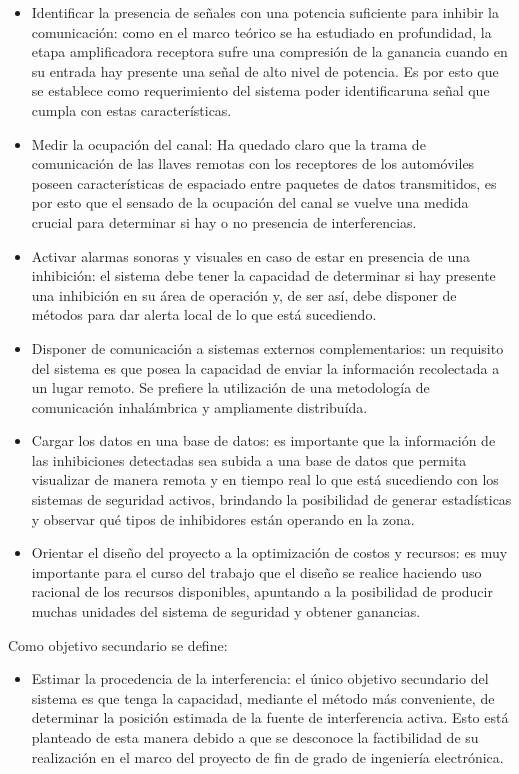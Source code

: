 \documentclass[12pt]{report}
\begin{document}
\begin{itemize}
    \item Identificar la presencia de señales con una potencia suficiente para inhibir la comunicación: como en el marco teórico se ha 
    estudiado en profundidad, la etapa amplificadora receptora sufre una compresión de la ganancia cuando en su entrada hay presente 
    una señal de alto nivel de potencia. Es por esto que se establece como requerimiento del sistema poder identificaruna señal que cumpla con
    estas características.
    \item Medir la ocupación del canal: Ha quedado claro que la trama de comunicación de las llaves remotas con los receptores de los automóviles 
    poseen características de espaciado entre paquetes de datos transmitidos, es por esto que el sensado de la ocupación del canal se vuelve 
    una medida crucial para determinar si hay o no presencia de interferencias.
    \item Activar alarmas sonoras y visuales en caso de estar en presencia de una inhibición: el sistema debe tener la capacidad de determinar 
    si hay presente una inhibición en su área de operación y, de ser así, debe disponer de métodos para dar alerta local de lo que está sucediendo.
    \item Disponer de comunicación a sistemas externos complementarios: un requisito del sistema es que posea la capacidad de enviar la información recolectada
    a un lugar remoto. Se prefiere la utilización de una metodología de comunicación inhalámbrica y ampliamente distribuída.
    \item Cargar los datos en una base de datos: es importante que la información de las inhibiciones detectadas sea subida a una base de datos
    que permita visualizar de manera remota y en tiempo real lo que está sucediendo con los sistemas de seguridad activos, brindando la posibilidad 
    de generar estadísticas y observar qué tipos de inhibidores están operando en la zona.
    \item Orientar el diseño del proyecto a la optimización de costos y recursos: es muy importante para el curso del trabajo que el diseño 
    se realice haciendo uso racional de los recursos disponibles, apuntando a la posibilidad de producir muchas unidades del sistema de seguridad
    y obtener ganancias.

\end{itemize}

Como objetivo secundario se define:

\begin{itemize}
    \item Estimar la procedencia de la interferencia: el único objetivo secundario del sistema es que tenga la capacidad, mediante el método 
    más conveniente, de determinar la posición estimada de la fuente de interferencia activa. Esto está planteado de esta manera debido a que 
    se desconoce la factibilidad de su realización en el marco del proyecto de fin de grado de ingeniería electrónica.
\end{itemize}
\end{document}
